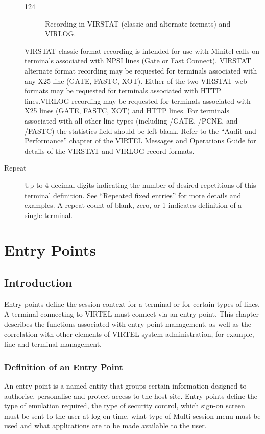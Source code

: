 \documentclass[letterpaper,10pt,english]{sphinxmanual}
\begin{document}
\begin{description}
\begin{description}
\item[{124}] \leavevmode
Recording in VIRSTAT (classic and alternate formats) and VIRLOG.

\end{description}

VIRSTAT classic format recording is intended for use with Minitel calls on terminals associated with NPSI lines (Gate or Fast Connect). VIRSTAT alternate format recording may be requested for terminals associated with any X25 line (GATE, FASTC, XOT). Either of the two VIRSTAT web formats may be requested for terminals associated with HTTP lines.VIRLOG recording may be requested for terminals associated with X25 lines (GATE, FASTC, XOT) and HTTP lines. For terminals associated with all other line types (including /GATE, /PCNE, and /FASTC) the statistics field should be left blank. Refer to the “Audit and Performance” chapter of the VIRTEL Messages and Operations Guide for details of the VIRSTAT and VIRLOG record formats.

\item[{Repeat}] \leavevmode
Up to 4 decimal digits indicating the number of desired repetitions of this terminal definition. See “Repeated fixed entries” for more details and examples.
A repeat count of blank, zero, or 1 indicates definition of a single terminal.

\end{description}


\chapter{Entry Points}
\label{\detokenize{connectivity_guide:entry-points}}

\section{Introduction}
\label{\detokenize{connectivity_guide:id5}}
Entry points define the session context for a terminal or for certain types of lines. A terminal connecting to VIRTEL must connect via an entry point. This chapter describes the functions associated with entry point management, as well as the correlation with other elements of VIRTEL system administration, for example, line and terminal management.


\subsection{Definition of an Entry Point}
\label{\detokenize{connectivity_guide:definition-of-an-entry-point}}
An entry point is a named entity that groups certain information designed to authorise, personalise and protect access to the host site. Entry points define the type of emulation required, the type of security control, which sign-on screen must be sent to the user at log on time, what type of Multi-session menu must be used and what applications are to be made available to the user.
\end{document}
